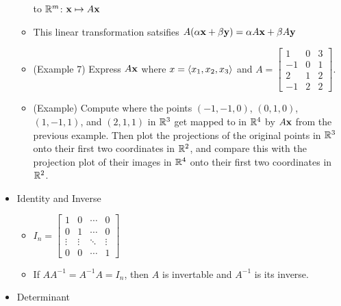 \documentclass[11pt]{article}
\begin{document}
\begin{itemize}
\begin{itemize}
            to \(\mathbb R^m\): \(\mathbf{x} \mapsto A\mathbf{x}\)
      \item This linear transformation satsifies
            \(
              A(\alpha\mathbf{x} + \beta\mathbf{y})
                =
              \alpha A\mathbf{x} + \beta A\mathbf{y}
            \)
      \item (Example 7) Express \(A\mathbf{x}\) where \(x=\langle x_1,x_2,x_3\rangle\) and
        \(
          A =
          \begin{bmatrix}
             1 &  0 &  3 \\
            -1 &  0 &  1 \\
             2 &  1 &  2 \\
            -1 &  2 &  2
          \end{bmatrix}
        \).
      \item (Example) Compute where the points
          \((-1,-1,0)\),
          \((0,1,0)\),
          \((1,-1,1)\), and
          \((2,1,1)\)
        in \(\mathbb R^3\) get
        mapped to in \(\mathbb R^4\) by \(A\mathbf{x}\) from the previous example.
        Then plot the projections of the original points in \(\mathbb R^3\) onto
        their first two coordinates in \(\mathbb R^2\),
        and compare this with the projection plot
        of their images in \(\mathbb R^4\) onto their first two coordinates in
        \(\mathbb R^2\).
    \end{itemize}
  \item Identity and Inverse
    \begin{itemize}
      \item
        \(
          I_n =
          \begin{bmatrix}
            1      & 0      & \cdots & 0      \\
            0      & 1      & \cdots & 0      \\
            \vdots & \vdots & \ddots & \vdots \\
            0      & 0      & \cdots & 1
          \end{bmatrix}
        \)
      \item
        If \(AA^{-1}=A^{-1}A=I_n\), then \(A\) is invertable and
        \(A^{-1}\) is its inverse.
    \end{itemize}
  \item Determinant
\end{itemize}
\end{document}
